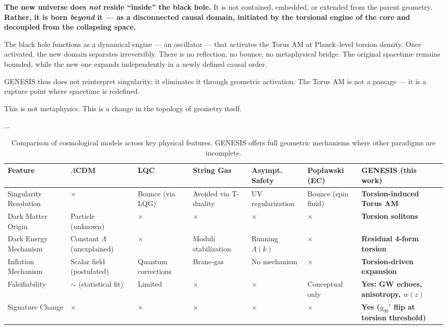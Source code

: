 \documentclass{article}
\begin{document}
\textbf{The new universe does \emph{not} reside “inside” the black hole.}  
It is not contained, embedded, or extended from the parent geometry.  
\textbf{Rather, it is born \emph{beyond} it — as a disconnected causal domain, initiated by the torsional engine of the core and decoupled from the collapsing space.}  

The black hole functions as a dynamical engine — an oscillator — that activates the Torus AM at Planck–level torsion density. Once activated, the new domain separates irreversibly. There is no reflection, no bounce, no metaphysical bridge. The original spacetime remains bounded, while the new one expands independently in a newly defined causal order.

GENESIS thus does not reinterpret singularity; it eliminates it through geometric activation. The Torus AM is not a passage — it is a rupture point where spacetime is redefined.

This is not metaphysics. This is a change in the topology of geometry itself.





...

\begin{table}[ht]
\centering
\caption{Comparison of cosmological models across key physical features. GENESIS offers full geometric mechanisms where other paradigms are incomplete.}
\label{tab:model_comparison_vertical}
\begin{adjustbox}{max width=\textwidth}
\scriptsize
\renewcommand{\arraystretch}{1.4}
\begin{tabular}{|p{}|p{}|p{2.4cm}|p{2.3cm}|p{2.4cm}|p{2.4cm}|p{3.9cm}|}
\hline
\textbf{Feature} & \textbf{$\Lambda$CDM} & \textbf{LQC} & \textbf{String Gas} & \textbf{Asympt. Safety} & \textbf{Popławski (EC)} & \textbf{GENESIS (this work)} \\
\hline
Singularity Resolution & $\times$ & Bounce (via LQG) & Avoided via T-duality & UV regularization & Bounce (spin fluid) & \textbf{Torsion-induced Torus AM} \\
\hline
Dark Matter Origin & Particle (unknown) & $\times$ & $\times$ & $\times$ & $\times$ & \textbf{Torsion solitons} \\
\hline
Dark Energy Mechanism & Constant $\Lambda$ (unexplained) & $\times$ & Moduli stabilization & Running $\Lambda(k)$ & $\times$ & \textbf{Residual 4-form torsion} \\
\hline
Inflation Mechanism & Scalar field (postulated) & Quantum corrections & Brane-gas & No mechanism & $\times$ & \textbf{Torsion-driven expansion} \\
\hline
Falsifiability & $\sim$ (statistical fit) & Limited & $\times$ & $\times$ & Conceptual only & \textbf{Yes: GW echoes, anisotropy, $w(z)$} \\
\hline
Signature Change & $\times$ & $\times$ & $\times$ & $\times$ & $\times$ & \textbf{Yes ($g_{00}'$ flip at torsion threshold)} \\
\hline
\end{tabular}
\end{adjustbox}
\end{table}
\end{document}
